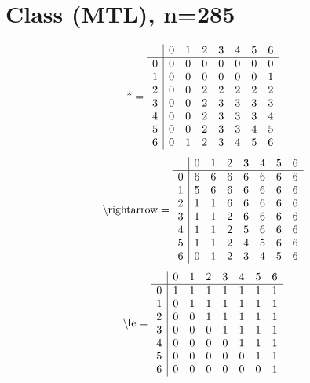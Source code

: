 \documentclass[11pt]{article}
\begin{document}
\section{Class (MTL), n=285}
\[\text{*} = 
\begin{array}{r | r r r r r r r}
 & 0 & 1 & 2 & 3 & 4 & 5 & 6 \\ \hline
0 & 0 & 0 & 0 & 0 & 0 & 0 & 0 \\
1 & 0 & 0 & 0 & 0 & 0 & 0 & 1 \\
2 & 0 & 0 & 2 & 2 & 2 & 2 & 2 \\
3 & 0 & 0 & 2 & 3 & 3 & 3 & 3 \\
4 & 0 & 0 & 2 & 3 & 3 & 3 & 4 \\
5 & 0 & 0 & 2 & 3 & 3 & 4 & 5 \\
6 & 0 & 1 & 2 & 3 & 4 & 5 & 6 \\
\end{array}
\]
\[\text{\textbackslash rightarrow} = 
\begin{array}{r | r r r r r r r}
 & 0 & 1 & 2 & 3 & 4 & 5 & 6 \\ \hline
0 & 6 & 6 & 6 & 6 & 6 & 6 & 6 \\
1 & 5 & 6 & 6 & 6 & 6 & 6 & 6 \\
2 & 1 & 1 & 6 & 6 & 6 & 6 & 6 \\
3 & 1 & 1 & 2 & 6 & 6 & 6 & 6 \\
4 & 1 & 1 & 2 & 5 & 6 & 6 & 6 \\
5 & 1 & 1 & 2 & 4 & 5 & 6 & 6 \\
6 & 0 & 1 & 2 & 3 & 4 & 5 & 6 \\
\end{array}
\]
\[\text{\textbackslash le} = 
\begin{array}{r | r r r r r r r}
 & 0 & 1 & 2 & 3 & 4 & 5 & 6 \\ \hline
0 & 1 & 1 & 1 & 1 & 1 & 1 & 1 \\
1 & 0 & 1 & 1 & 1 & 1 & 1 & 1 \\
2 & 0 & 0 & 1 & 1 & 1 & 1 & 1 \\
3 & 0 & 0 & 0 & 1 & 1 & 1 & 1 \\
4 & 0 & 0 & 0 & 0 & 1 & 1 & 1 \\
5 & 0 & 0 & 0 & 0 & 0 & 1 & 1 \\
6 & 0 & 0 & 0 & 0 & 0 & 0 & 1 \\
\end{array}
\]
\end{document}
